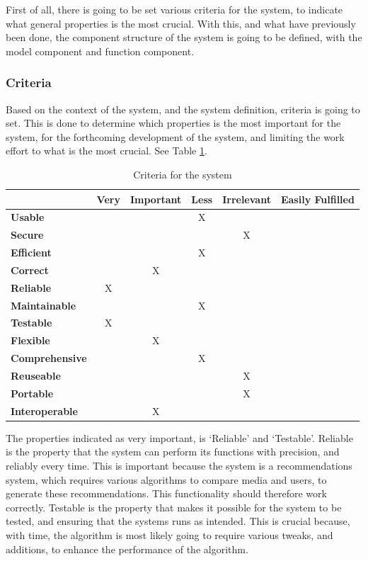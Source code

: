 First of all, there is going to be set various criteria for the system, to indicate what general properties is the most crucial. With this, and what have previously been done, the component structure of the system is going to be defined, with the model component and function component. 

\subsubsection{Criteria}

Based on the context of the system, and the system definition, criteria is going to set. This is done to determine which properties is the most important for the system, for the forthcoming development of the system, and limiting the work effort to what is the most crucial. See Table \ref{Criteria}.

\begin{table}[htb]
\centering
\begin{tabular}{|l|c|c|c|c|c|} \hline
	  & \textbf{Very} & \textbf{Important} & \textbf{Less} & \textbf{Irrelevant} & \textbf{Easily Fulfilled} \\ \hline
	\textbf{Usable} &  &  & X &  & \\ \hline
	\textbf{Secure} &  &  &  & X &  \\ \hline
	\textbf{Efficient} &  &  & X &  &  \\ \hline
	\textbf{Correct} &  & X &  &  &  \\ \hline
	\textbf{Reliable} & X &  &  &  &  \\ \hline
	\textbf{Maintainable} &  &  & X &  &  \\ \hline
	\textbf{Testable} & X &  &  &  &  \\ \hline
	\textbf{Flexible} &  & X &  &  &  \\ \hline
	\textbf{Comprehensive} &  &  & X &  &  \\ \hline
	\textbf{Reuseable} &  &  &  & X &  \\ \hline
	\textbf{Portable} &  &  &  & X &  \\ \hline
	\textbf{Interoperable} &  & X &  &  &  \\ \hline
\end{tabular}
\caption{Criteria for the system}
\label{Criteria}
\end{table}

The properties indicated as very important, is ‘Reliable’ and ‘Testable’. Reliable is the property that the system can perform its functions with precision, and reliably every time. This is important because the system is a recommendations system, which requires various algorithms to compare media and users, to generate these recommendations. This functionality should therefore work correctly. Testable is the property that makes it possible for the system to be tested, and ensuring that the systems runs as intended. This is crucial because, with time, the algorithm is most likely going to require various tweaks, and additions, to enhance the performance of the algorithm.

